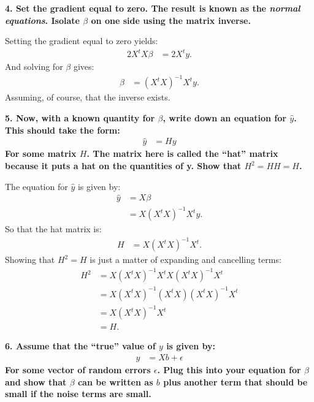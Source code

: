 \documentclass[12pt,hidelinks]{article}
\numberwithin{equation}{section}
\begin{document}
\textbf{4. Set the gradient equal to zero. The result is known as the
\textit{normal equations}. Isolate $\beta$ on one side using the matrix inverse.}

\vspace*{12pt}

Setting the gradient equal to zero yields:
\begin{align}
2 X^t X \beta &= 2 X^t y.
\end{align}
And solving for $\beta$ gives:
\begin{align}
\beta &= (X^t X)^{-1} X^t y.
\end{align}
Assuming, of course, that the inverse exists.


\vspace*{12pt}

\textbf{5. Now, with a known quantity for $\beta$, write down an equation for $\widehat{y}$.
This should take the form:}
\begin{align}
\widehat{y} &= H y
\end{align}
\textbf{For some matrix $H$. The matrix here is called the ``hat'' matrix because it
puts a hat on the quantities of y. Show that $H^2 = HH = H$.}

\vspace*{12pt}

The equation for $\widehat{y}$ is given by:
\begin{align}
\widehat{y} &= X\beta\\
&= X (X^t X)^{-1} X^t y.
\end{align}
So that the hat matrix is:
\begin{align}
H &= X (X^t X)^{-1} X^t.
\end{align}
Showing that $H^2 = H$ is just a matter of expanding and cancelling terms:
\begin{align}
H^2 &= X (X^t X)^{-1} X^t X (X^t X)^{-1} X^t \\
&= X (X^t X)^{-1} (X^t X) (X^t X)^{-1} X^t \\
&= X (X^t X)^{-1} X^t \\
&= H.
\end{align}

\vspace*{12pt}

\textbf{6. Assume that the ``true'' value of $y$ is given by:}
\begin{align}
y &= X b + \epsilon
\end{align}
\textbf{For some vector of random errors $\epsilon$. Plug this into your equation for
$\beta$ and show that $\beta$ can be written as $b$ plus another term that should
be small if the noise terms are small.}
\end{document}
